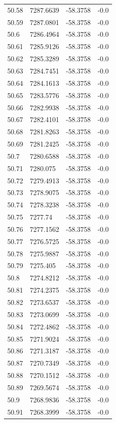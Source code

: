 \begin{table}[H]
\begin{tabular}{llll}
50.58 & 7287.6639 & -58.3758 & -0.0 \\
50.59 & 7287.0801 & -58.3758 & -0.0 \\
50.6 & 7286.4964 & -58.3758 & -0.0 \\
50.61 & 7285.9126 & -58.3758 & -0.0 \\
50.62 & 7285.3289 & -58.3758 & -0.0 \\
50.63 & 7284.7451 & -58.3758 & -0.0 \\
50.64 & 7284.1613 & -58.3758 & -0.0 \\
50.65 & 7283.5776 & -58.3758 & -0.0 \\
50.66 & 7282.9938 & -58.3758 & -0.0 \\
50.67 & 7282.4101 & -58.3758 & -0.0 \\
50.68 & 7281.8263 & -58.3758 & -0.0 \\
50.69 & 7281.2425 & -58.3758 & -0.0 \\
50.7 & 7280.6588 & -58.3758 & -0.0 \\
50.71 & 7280.075 & -58.3758 & -0.0 \\
50.72 & 7279.4913 & -58.3758 & -0.0 \\
50.73 & 7278.9075 & -58.3758 & -0.0 \\
50.74 & 7278.3238 & -58.3758 & -0.0 \\
50.75 & 7277.74 & -58.3758 & -0.0 \\
50.76 & 7277.1562 & -58.3758 & -0.0 \\
50.77 & 7276.5725 & -58.3758 & -0.0 \\
50.78 & 7275.9887 & -58.3758 & -0.0 \\
50.79 & 7275.405 & -58.3758 & -0.0 \\
50.8 & 7274.8212 & -58.3758 & -0.0 \\
50.81 & 7274.2375 & -58.3758 & -0.0 \\
50.82 & 7273.6537 & -58.3758 & -0.0 \\
50.83 & 7273.0699 & -58.3758 & -0.0 \\
50.84 & 7272.4862 & -58.3758 & -0.0 \\
50.85 & 7271.9024 & -58.3758 & -0.0 \\
50.86 & 7271.3187 & -58.3758 & -0.0 \\
50.87 & 7270.7349 & -58.3758 & -0.0 \\
50.88 & 7270.1512 & -58.3758 & -0.0 \\
50.89 & 7269.5674 & -58.3758 & -0.0 \\
50.9 & 7268.9836 & -58.3758 & -0.0 \\
50.91 & 7268.3999 & -58.3758 & -0.0 \\

\end{tabular}
\end{table}
